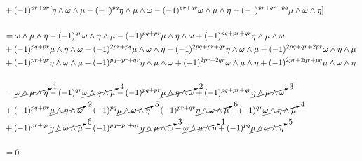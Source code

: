 \documentclass[10pt]{article}
\begin{document}
\begin{itemize}
\begin{enumerate}
$$\begin{aligned}
			&+(-1)^{pr+qr}[\eta \wedge \omega \wedge \mu - (-1)^{pq} \eta \wedge \mu \wedge \omega - (-1)^{pr+qr} \omega \wedge \mu \wedge \eta + (-1)^{pr+qr+pq} \mu \wedge \omega \wedge \eta]\\\\
			&= \omega \wedge \mu \wedge \eta - (-1)^{qr} \omega \wedge \eta \wedge \mu - (-1)^{pq+pr} \mu \wedge \eta \wedge \omega + (-1)^{pq+pr+qr} \eta \wedge \mu \wedge \omega\\
			&+(-1)^{pq+pr} \mu \wedge \eta \wedge \omega - (-1)^{2pr+pq} \mu \wedge \omega \wedge \eta - (-1)^{2pq+pr+qr} \eta \wedge \omega \wedge \mu + (-1)^{2pq+qr+2pr} \omega \wedge \eta \wedge \mu\\
			&+(-1)^{pr+qr} \eta \wedge \omega \wedge \mu - (-1)^{pq+pr+qr} \eta \wedge \mu \wedge \omega + (-1)^{2pr+2qr} \omega \wedge \mu \wedge \eta + (-1)^{2pr+2qr+pq} \mu \wedge \omega \wedge \eta\\\\
			&= \cancelto{1}{\omega \wedge \mu \wedge \eta} - (-1)^{qr} \cancelto{4}{\omega \wedge \eta \wedge \mu} - (-1)^{pq+pr} \cancelto{2}{\mu \wedge \eta \wedge \omega} + (-1)^{pq+pr+qr} \cancelto{3}{\eta \wedge \mu \wedge \omega}\\
			&+(-1)^{pq+pr} \cancelto{2}{\mu \wedge \eta \wedge \omega} - (-1)^{pq} \cancelto{5}{\mu \wedge \omega \wedge \eta} - (-1)^{pr+qr} \cancelto{6}{\eta \wedge \omega \wedge \mu} + (-1)^{qr} \cancelto{4}{\omega \wedge \eta \wedge \mu}\\
			&+(-1)^{pr+qr} \cancelto{6}{\eta \wedge \omega \wedge \mu} - (-1)^{pq+pr+qr} \cancelto{3}{\eta \wedge \mu \wedge \omega} - \cancelto{1}{\omega \wedge \mu \wedge \eta} + (-1)^{pq} \cancelto{5}{\mu \wedge \omega \wedge \eta}\\\\
			&=0
		\end{aligned} 
		$$
	\end{enumerate}

\end{itemize}
\end{document}
